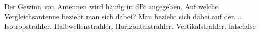     {Der Gewinn von Antennen wird häufig in dBi angegeben. Auf welche Vergleichsantenne bezieht man sich dabei? Man bezieht sich dabei auf den ...}
    {Isotropstrahler.}
    {Halbwellenstrahler.}
    {Horizontalstrahler.}
    {Vertikalstrahler.}
    {false}{false}